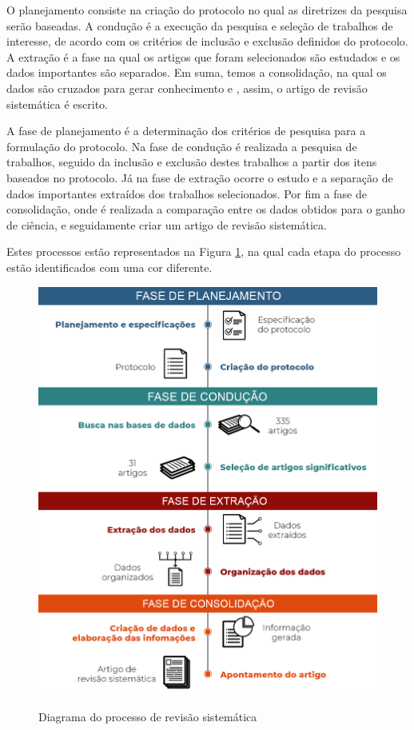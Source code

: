 \documentclass[
	12pt,				%
	oneside,			%
	a4paper,			%
	english,			%
	brazil				%
	]{abntex2ppgsi}
\begin{document}
O planejamento consiste na criação do protocolo no qual as diretrizes da pesquisa serão baseadas. A condução é a execução da pesquisa e seleção de trabalhos de interesse, de acordo com os critérios de inclusão e exclusão definidos do protocolo. A extração é a fase na qual os artigos que foram selecionados são estudados e os dados importantes são separados. Em suma, temos a consolidação, na qual os dados são cruzados para gerar conhecimento e , assim, o artigo de revisão sistemática é escrito.

A fase de planejamento é a determinação dos critérios de pesquisa para a formulação do protocolo. Na fase de condução é realizada a pesquisa de trabalhos, seguido da inclusão e exclusão destes trabalhos a partir dos itens baseados no protocolo. Já na fase de extração ocorre o estudo e a separação de dados importantes extraídos dos trabalhos selecionados. Por fim a fase de consolidação, onde é realizada a comparação entre os dados obtidos para o ganho de ciência, e seguidamente criar um artigo de revisão sistemática.

Estes processos estão representados na Figura \ref{fig:processo_revisao_sistematica}, na qual cada etapa do processo estão identificados com uma cor diferente.

\begin{figure}[H]
    \centering
    \caption{Diagrama do processo de revisão sistemática}
    \includegraphics[scale=.35]{imagens/revisao_sistematica/processo_revisao_sistematica.jpg}
    \label{fig:processo_revisao_sistematica}
\end{figure}
\end{document}
